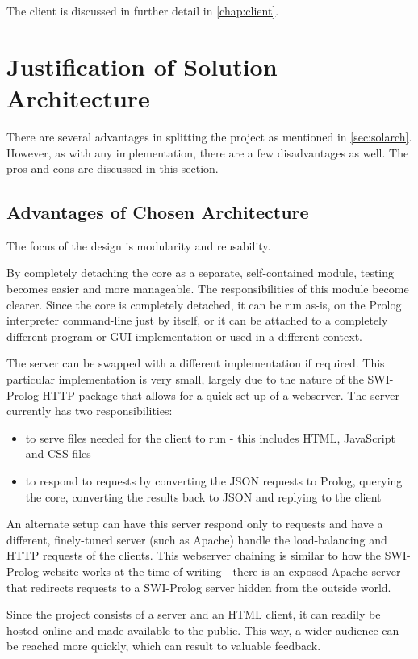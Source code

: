 \documentclass[11pt,twoside,a4paper]{report}
\begin{document}
The client is discussed in further detail in \autoref{chap:client}.

\section{Justification of Solution Architecture}
There are several advantages in splitting the project as mentioned in \autoref{sec:solarch}. However, as with any implementation, there are a few disadvantages as well. The pros and cons are discussed in this section.

\subsection{Advantages of Chosen Architecture}
The focus of the design is modularity and reusability. 

By completely detaching the core as a separate, self-contained module, testing becomes easier and more manageable. The responsibilities of this module become clearer. Since the core is completely detached, it can be run as-is, on the Prolog interpreter command-line just by itself, or it can be attached to a completely different program or GUI implementation or used in a different context.

The server can be swapped with a different implementation if required. This particular implementation is very small, largely due to the nature of the SWI-Prolog HTTP package that allows for a quick set-up of a webserver. The server currently has two responsibilities:

\begin{itemize}
\item
to serve files needed for the client to run - this includes HTML, JavaScript and CSS files
\item
to respond to requests by converting the JSON requests to Prolog, querying the core, converting the results back to JSON and replying to the client
\end{itemize}

An alternate setup can have this server respond only to requests and have a different, finely-tuned server (such as Apache) handle the load-balancing and HTTP requests of the clients. This webserver chaining is similar to how the SWI-Prolog website works at the time of writing - there is an exposed Apache server that redirects requests to a SWI-Prolog server hidden from the outside world. 

Since the project consists of a server and an HTML client, it can readily be hosted online and made available to the public. This way, a wider audience can be reached more quickly, which can result to valuable feedback.
\end{document}
